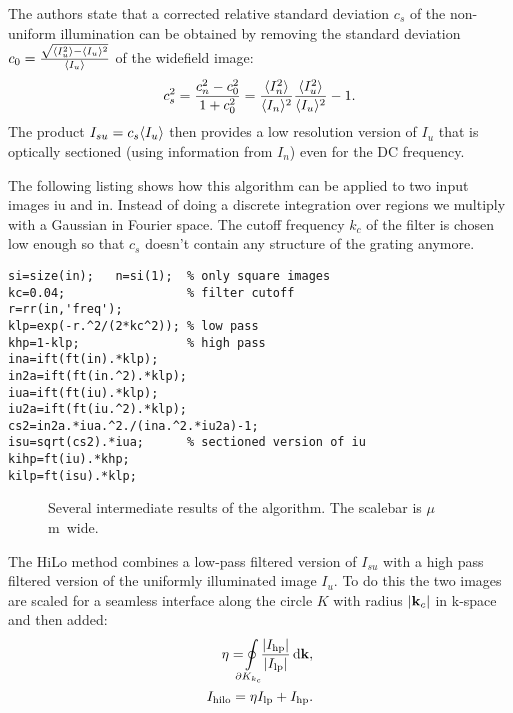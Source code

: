 The authors state that a corrected relative standard deviation $c_s$
of the non-uniform illumination can be obtained by removing the
standard deviation
$c_0=\frac{\sqrt{\langle I_u^2 \rangle-\langle I_u \rangle^2}}{\langle I_u \rangle}$ of the
widefield image:
\begin{align} 
  c_s^2=\frac{c_n^2-c_0^2}{1+c_0^2}
  =
  \frac{\langle I_n^2 \rangle}{\langle I_n \rangle^2}
  \frac{\langle I_u^2 \rangle}{\langle I_u \rangle^2}-1.
\end{align}
The product $I_{su}=c_s\langle I_u \rangle$ then provides a low resolution
version of $I_u$ that is optically sectioned (using information from
$I_n$) even for the DC frequency.

The following listing shows how this algorithm can be applied to two
input images {\sf iu} and {\sf in}. Instead of doing a discrete
integration over regions we multiply with a Gaussian in Fourier
space. The cutoff frequency $k_c$ of the filter is chosen low enough
so that $c_s$ doesn't contain any structure of the grating anymore.
\begin{lstlisting}
si=size(in);   n=si(1);  % only square images
kc=0.04;                 % filter cutoff
r=rr(in,'freq');
klp=exp(-r.^2/(2*kc^2)); % low pass
khp=1-klp;               % high pass
ina=ift(ft(in).*klp);
in2a=ift(ft(in.^2).*klp);
iua=ift(ft(iu).*klp);
iu2a=ift(ft(iu.^2).*klp);
cs2=in2a.*iua.^2./(ina.^2.*iu2a)-1;
isu=sqrt(cs2).*iua;      % sectioned version of iu
kihp=ft(iu).*khp;
kilp=ft(isu).*klp;
\end{lstlisting}
\begin{figure}[htb]
  \centering
  \caption{Several intermediate results of the algorithm. The scalebar is
    \unit[2]{$\mu$m} wide.}
  \label{fig:hilo1interm}
\end{figure}
The HiLo method combines a low-pass filtered version of $I_{su}$ with
a high pass filtered version of the uniformly illuminated image $I_u$.
To do this the two images are scaled for a seamless interface along
the circle $K$ with radius $\mathopen| \mathbf{k}_c \mathclose|$ in k-space and then added:
\begin{align}
  \eta=\!\!\!\!\ointop_{\partial K_{k_c}}\!\!\!
  \frac{\abs{I_\textrm{hp}}}{\abs{I_\textrm{lp}}}\,\textrm{d}\vect k,\\
  I_\textrm{hilo}=\eta I_\textrm{lp}+I_\textrm{hp}.
\end{align}

